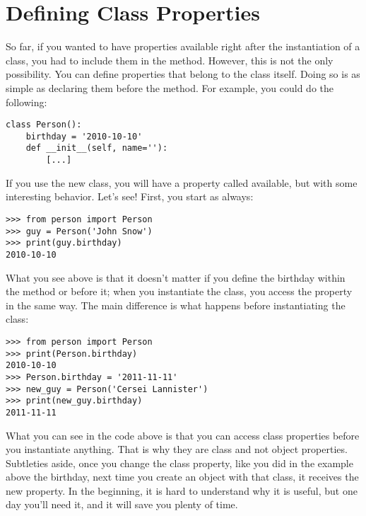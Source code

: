 
\section{Defining Class Properties}\label{sec:defining-class-properties}
So far, if you wanted to have properties available right after the instantiation of a class, you had to include them in the  method. However, this is not the only possibility. You can define properties that belong to the class itself. Doing so is as simple as declaring them before the  method. For example, you could do the following:

\begin{verbatim}
class Person():
    birthday = '2010-10-10'
    def __init__(self, name=''):
        [...]
\end{verbatim}

If you use the new  class, you will have a property called  available, but with some interesting behavior. Let's see! First, you start as always:

\begin{verbatim}
>>> from person import Person
>>> guy = Person('John Snow')
>>> print(guy.birthday)
2010-10-10
\end{verbatim}

What you see above is that it doesn't matter if you define the birthday within the  method or before it; when you instantiate the class, you access the property in the same way. The main difference is what happens before instantiating the class:

\begin{verbatim}
>>> from person import Person
>>> print(Person.birthday)
2010-10-10
>>> Person.birthday = '2011-11-11'
>>> new_guy = Person('Cersei Lannister')
>>> print(new_guy.birthday)
2011-11-11
\end{verbatim}

What you can see in the code above is that you can access class properties before you instantiate anything. That is why they are class and not object properties. Subtleties aside, once you change the class property, like you did in the example above the birthday, next time you create an object with that class, it receives the new property. In the beginning, it is hard to understand why it is useful, but one day you'll need it, and it will save you plenty of time.

